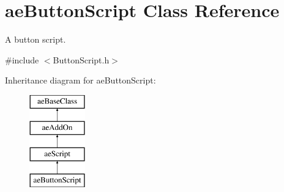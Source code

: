\hypertarget{classae_button_script}{}\section{ae\+Button\+Script Class Reference}
\label{classae_button_script}


A button script.  




{\ttfamily \#include $<$Button\+Script.\+h$>$}

Inheritance diagram for ae\+Button\+Script\+:\begin{figure}[H]
\begin{center}
\leavevmode
\includegraphics[height=4.000000cm]{classae_button_script}
\end{center}
\end{figure}
